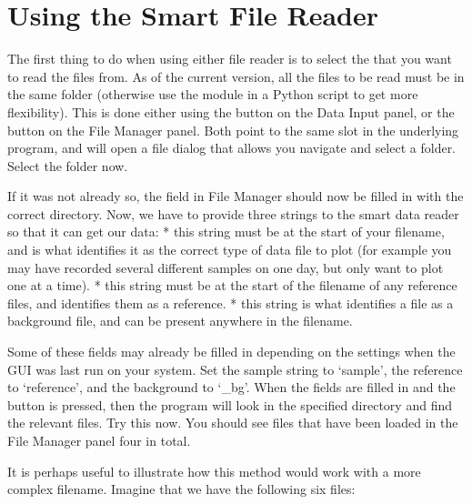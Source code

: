 \documentclass[a4paper,10pt,english]{sphinxmanual}
\begin{document}
\section{Using the Smart File Reader}
\label{\detokenize{index:using-the-smart-file-reader}}
\sphinxAtStartPar
The first thing to do when using either file reader is to select the  that you want to read the files from. As of the current version, all the files to be read must be in the same folder (otherwise use the module in a Python script to get more flexibility). This is done either using the  button on the Data Input panel, or the  button on the File Manager panel. Both point to the same slot in the underlying program, and will open a file dialog that allows you navigate and select a folder. Select the  folder now.

\sphinxAtStartPar
If it was not already so, the  field in File Manager should now be filled in with the correct directory. Now, we have to provide three strings to the smart data reader so that it can get our data:
*  \sphinxhyphen{} this string must be at the start of your filename, and is what identifies it as the correct type of data file to plot (for example \sphinxhyphen{} you may have recorded several different samples on one day, but only want to plot one at a time).
*  \sphinxhyphen{} this string must be at the start of the filename of any reference files, and identifies them as a reference.
*  \sphinxhyphen{} this string is what identifies a file as a background file, and can be present anywhere in the filename.

\sphinxAtStartPar
Some of these fields may already be filled in depending on the settings when the GUI was last run on your system. Set the sample string to ‘sample’, the reference to ‘reference’, and the background to ‘\_bg’. When the fields are filled in and the  button is pressed, then the program will look in the specified directory and find the relevant files. Try this now. You should see files that have been loaded in the File Manager panel \sphinxhyphen{} four in total.

\sphinxAtStartPar
It is perhaps useful to illustrate how this method would work with a more complex filename. Imagine that we have the following six files:
\end{document}
